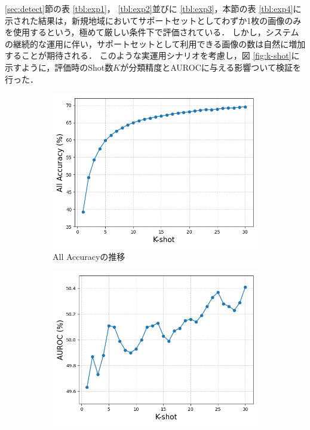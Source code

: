 \ref{sec:detect}節の表 \ref{tbl:exp1}， \ref{tbl:exp2}並びに \ref{tbl:exp3}，本節の表 \ref{tbl:exp4}に示された結果は，新規地域においてサポートセットとしてわずか1枚の画像のみを使用するという，極めて厳しい条件下で評価されている．
しかし，システムの継続的な運用に伴い，サポートセットとして利用できる画像の数は自然に増加することが期待される．
このような実運用シナリオを考慮し，図 \ref{fig:k-shot}に示すように，評価時のShot数$K$が分類精度とAUROCに与える影響ついて検証を行った．
% 
\begin{figure}[tbp]
  \centering
  \begin{subfigure}[b]{0.45\linewidth}
    \centering
    \includegraphics[height=0.9\linewidth, keepaspectratio]{image/sec2k-shotVSaccuracy.png}
    \caption{All Accuracyの推移}
    \label{fig:sec2Accuracy}
  \end{subfigure}
  \hfill
  \begin{subfigure}[b]{0.45\linewidth}
    \centering
    \includegraphics[height=0.9\linewidth, keepaspectratio]{image/sec2k-shotVSAUROC.png}

\end{subfigure}
\end{figure}
